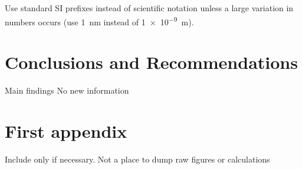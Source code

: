 \documentclass[a4paper,12pt]{article}
\begin{document}
Use standard SI prefixes instead of scientific notation unless a large variation in
numbers occurs (use \SI{1}{\nano\meter} instead of \SI{1e-9}{\meter}).

\section{Conclusions and Recommendations}
Main findings
No new information

\printbibliography
\appendix
\renewcommand{\thefigure}{\thesection.\arabic{figure}}
\renewcommand{\thetable}{\thesection.\arabic{table}}
\renewcommand{\thepage}{\thesection.\arabic{page}}

\section{First appendix}
\setcounter{figure}{0}
\setcounter{table}{0}
\setcounter{page}{1}
Include only if necessary. Not a place to dump raw figures or calculations
\end{document}
